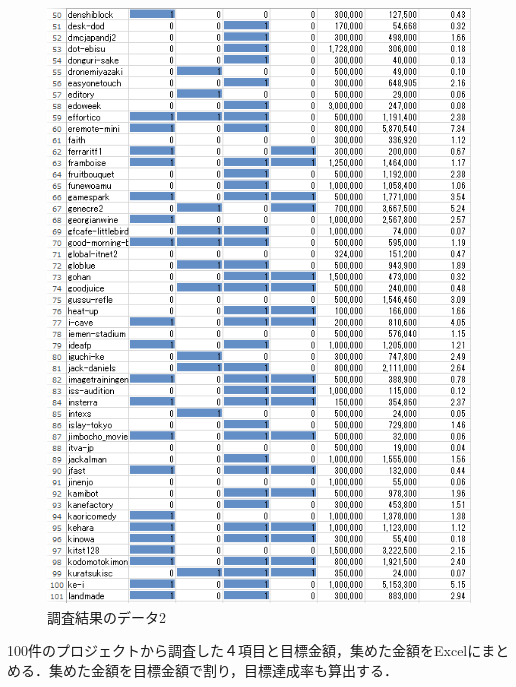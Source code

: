\begin{figure}[H]
\centering
\includegraphics[width=16cm]{chousa7.PNG}
\caption{調査結果のデータ2}\label{サンプル図}
\end{figure}
100件のプロジェクトから調査した４項目と目標金額，集めた金額をExcelにまとめる．集めた金額を目標金額で割り，目標達成率も算出する．


\newpage
